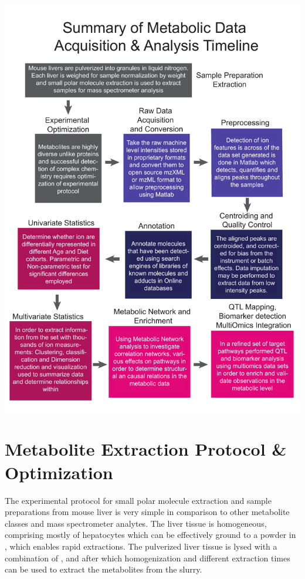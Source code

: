 \documentclass[a4paper,11pt,twoside]{book}
\begin{document}
	\includegraphics[width=1.2\linewidth]{3.Metabolomics/pipeline.pdf}
	
	\section{Metabolite Extraction Protocol \& Optimization}
	
	The experimental protocol for small polar molecule extraction and sample preparations from mouse liver is very simple in comparison to other metabolite classes and mass spectrometer analytes\citep{Mushtaq2014ExtractionMetabolome,Haynes2009Sphingolipidomics:Sphingolipids,Hu2009AnalyticalDiscovery}. The liver tissue is homogeneous, comprising mostly of hepatocytes which can be effectively ground to a powder in , which enables rapid extractions. The pulverized liver tissue is lysed with a combination of ,  and  after which homogenization and different extraction times can be used to extract the metabolites from the slurry. 
	
\end{document}
